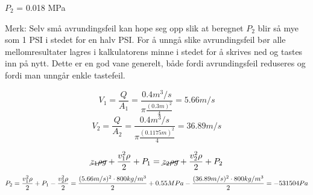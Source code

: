 





$P_2$ = 0.018 MPa

\vskip 10pt

Merk: Selv små avrundingsfeil kan hope seg opp slik at beregnet $P_2$ blir så mye som 1 PSI i stedet for en halv PSI. For å unngå slike avrundingsfeil bør alle mellomresultater lagres i kalkulatorens minne i stedet for å skrives ned og tastes inn på nytt. Dette er en god vane generelt, både fordi avrundingsfeil reduseres og fordi man unngår enkle tastefeil.







$$V_1=\frac{Q}{A_1}=\frac{0.4m^3/s}{\pi \frac{(0.3m)^2}{4}}=5.66m/s$$
$$V_2=\frac{Q}{A_2}=\frac{0.4m^3/s}{\pi \frac{(0.1175m)^2}{4}}=36.89m/s$$

$$\cancel{z_1 \rho g} + {v_1^2 \rho \over 2} + P_1 = \cancel{z_2 \rho g} + {v_2^2 \rho \over 2} + P_2$$
$$P_2={v_1^2 \rho \over 2} + P_1 - {v_2^2 \rho \over 2}=\frac{(5.66m/s)^2\cdot 800kg/m^3}{2}+0.55MPa-\frac{(36.89m/s)^2\cdot 800kg/m^3}{2}=-531504Pa$$



